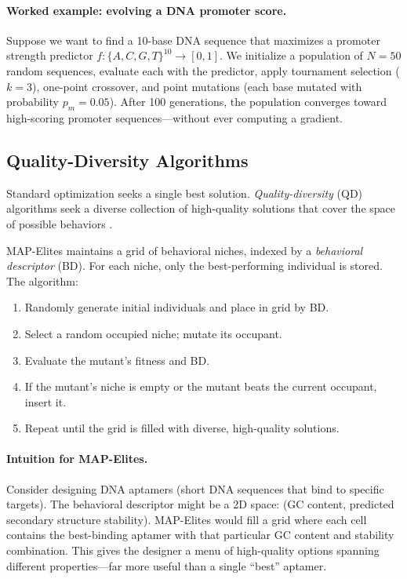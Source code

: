 \paragraph{Worked example: evolving a DNA promoter score.} Suppose we want to find a 10-base DNA sequence that maximizes a promoter strength predictor $f : \{A,C,G,T\}^{10} \to [0,1]$. We initialize a population of $N = 50$ random sequences, evaluate each with the predictor, apply tournament selection ($k=3$), one-point crossover, and point mutations (each base mutated with probability $p_m = 0.05$). After 100 generations, the population converges toward high-scoring promoter sequences---without ever computing a gradient.

\subsection{Quality-Diversity Algorithms}

Standard optimization seeks a single best solution. \emph{Quality-diversity} (QD) algorithms seek a diverse collection of high-quality solutions that cover the space of possible behaviors \citep{mouret2015}.

\begin{dogmadef}
MAP-Elites maintains a grid of behavioral niches, indexed by a \emph{behavioral descriptor} (BD). For each niche, only the best-performing individual is stored. The algorithm:
\begin{enumerate}[leftmargin=1.5em]
  \item Randomly generate initial individuals and place in grid by BD.
  \item Select a random occupied niche; mutate its occupant.
  \item Evaluate the mutant's fitness and BD.
  \item If the mutant's niche is empty or the mutant beats the current occupant, insert it.
  \item Repeat until the grid is filled with diverse, high-quality solutions.
\end{enumerate}
\end{dogmadef}

\paragraph{Intuition for MAP-Elites.} Consider designing DNA aptamers (short DNA sequences that bind to specific targets). The behavioral descriptor might be a 2D space: (GC content, predicted secondary structure stability). MAP-Elites would fill a grid where each cell contains the best-binding aptamer with that particular GC content and stability combination. This gives the designer a menu of high-quality options spanning different properties---far more useful than a single ``best'' aptamer.

